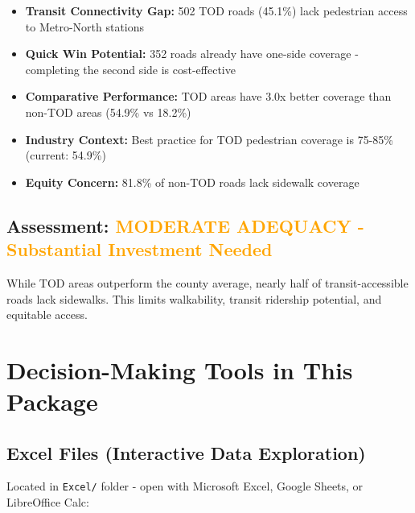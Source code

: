 \documentclass[11pt,letterpaper]{article}
\begin{document}
\begin{itemize}[leftmargin=*]
    \item \textbf{Transit Connectivity Gap:} 502 TOD roads (45.1\%) lack pedestrian access to Metro-North stations
    \item \textbf{Quick Win Potential:} 352 roads already have one-side coverage - completing the second side is cost-effective
    \item \textbf{Comparative Performance:} TOD areas have 3.0x better coverage than non-TOD areas (54.9\% vs 18.2\%)
    \item \textbf{Industry Context:} Best practice for TOD pedestrian coverage is 75-85\% (current: 54.9\%)
    \item \textbf{Equity Concern:} 81.8\% of non-TOD roads lack sidewalk coverage
\end{itemize}

\subsection*{Assessment: \textcolor{orange}{\textbf{MODERATE ADEQUACY - Substantial Investment Needed}}}

While TOD areas outperform the county average, nearly half of transit-accessible roads lack sidewalks. This limits walkability, transit ridership potential, and equitable access.

\vspace{1em}

\section{Decision-Making Tools in This Package}

\subsection{Excel Files (Interactive Data Exploration)}

Located in \texttt{Excel/} folder - open with Microsoft Excel, Google Sheets, or LibreOffice Calc:
\end{document}
